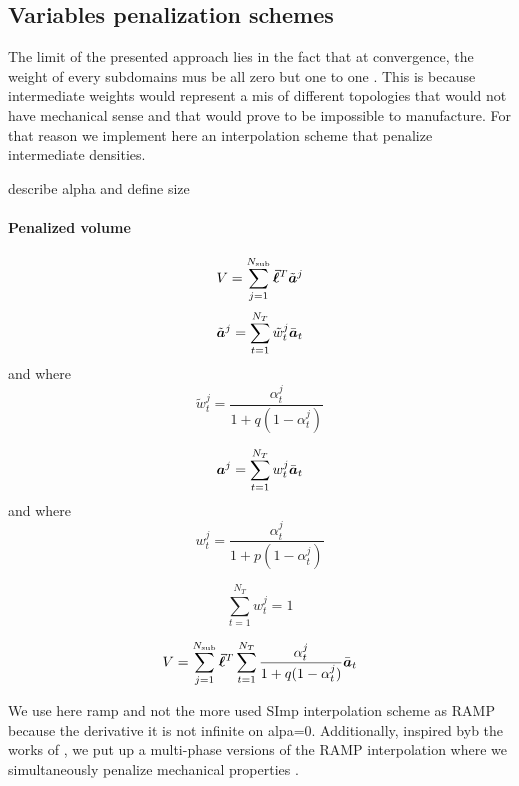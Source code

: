 \subsection{Variables penalization schemes}
The limit of the presented approach lies in the fact that at convergence, the weight of every subdomains mus be all zero but one to one . This is because intermediate weights would represent a mis of different topologies that would not have mechanical sense and that would prove to be impossible to manufacture. For that reason we implement here an interpolation scheme that penalize intermediate densities.

describe alpha and define size

\paragraph*{Penalized volume}
\begin{equation}
    V = \sum_{j=1}^{N_{\text{sub}}}\bm{\bar{\ell}}^T\tilde{\bm{a}}^j
\end{equation}
\begin{equation}
    \tilde{\bm{a}}^j = \sum_{t=1}^{N_T} \tilde{w}_t^j \bar{\bm{a}}_t 
\end{equation}
and where
\begin{equation}
    \tilde{w}_t^j = \frac{\alpha_t^j}{1+q(1-\alpha_t^j)}    
\end{equation}

\begin{equation}
    \bm{a}^j = \sum_{t=1}^{N_T} w_t^j \bar{\bm{a}}_t 
\end{equation}
and where
\begin{equation}
    w_t^j = \frac{\alpha_t^j}{1+p(1-\alpha_t^j)}    
\end{equation}

\begin{equation}
    \sum_{t=1}^{N_T} w_t^j = 1
\end{equation}

\begin{equation}
    V = \sum_{j=1}^{N_{\text{sub}}}\bm{\bar{\ell}}^T\sum_{t=1}^{N_T} \frac{\alpha_t^j}{1+q(1-\alpha_t^j)} \bar{\bm{a}}_t
\end{equation}

We use here \gls{ramp}  and not the more used SImp interpolation scheme as RAMP because the derivative it is not infinite on alpa=0. Additionally, inspired byb the works of , we put up a multi-phase versions of the RAMP interpolation where we simultaneously penalize mechanical properties . 


